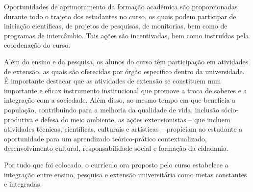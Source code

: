 Oportunidades de aprimoramento da formação acadêmica são proporcionadas durante todo o trajeto dos estudantes no curso, os quais podem participar de iniciação científicas, de projetos de pesquisas, de monitorias, bem como de programas de intercâmbio. Tais ações são incentivadas, bem como instruídas pela coordenação do curso.

Além do ensino e da pesquisa, os alunos do curso têm participação em atividades de extensão, as quais são oferecidas por órgão específico dentro da universidade. É importante destacar que as atividades de extensão se constituem num importante e eficaz instrumento institucional que promove a troca de saberes e a integração com a sociedade. Além disso, ao mesmo tempo em que beneficia a população, contribuindo para a melhoria da qualidade de vida, inclusão sócio-produtiva e defesa do meio ambiente, as ações extensionistas – que incluem atividades técnicas, científicas, culturais e artísticas – propiciam ao estudante a oportunidade para um aprendizado teórico-prático contextualizado, desenvolvimento cultural, responsabilidade social e formação da cidadania.

Por tudo que foi colocado, o currículo ora proposto pelo curso estabelece a integração entre ensino, pesquisa e extensão universitária como metas constantes e integradas. 
